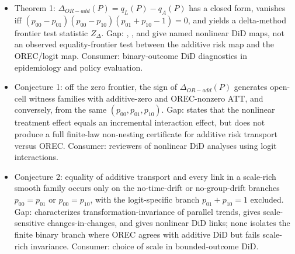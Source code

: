\documentclass[11pt]{article}
\theoremstyle{definition}
\theoremstyle{plain}
\theoremstyle{remark}
\begin{document}
\begin{itemize}[leftmargin=*]
\item Theorem 1: \(\Delta_{OR-add}(P)=q_L(P)-q_A(P)\) has a closed form, vanishes iff \((p_{00}-p_{01})(p_{00}-p_{10})(p_{01}+p_{10}-1)=0\), and yields a delta-method frontier test statistic \(Z_{\Delta}\). Gap: \citet[Abstract and Sec. 2]{ParkTchetgenTchetgen2022}, \citet[Abstract and Sec. 2]{TchetgenTchetgenParkRichardson2024}, and \citet[Sec. 2]{Wooldridge2023} give named nonlinear DiD maps, not an observed equality-frontier test between the additive risk map and the OREC/logit map. Consumer: binary-outcome DiD diagnostics in epidemiology and policy evaluation.
\item Conjecture 1: off the zero frontier, the sign of \(\Delta_{OR-add}(P)\) generates open-cell witness families with additive-zero and OREC-nonzero ATT, and conversely, from the same \((p_{00},p_{01},p_{10})\). Gap: \citet[p. 85, Abstract]{Puhani2012} states that the nonlinear treatment effect equals an incremental interaction effect, but does not produce a full finite-law non-nesting certificate for additive risk transport versus OREC. Consumer: reviewers of nonlinear DiD analyses using logit interactions.
\item Conjecture 2: equality of additive transport and every link in a scale-rich smooth family occurs only on the no-time-drift or no-group-drift branches \(p_{00}=p_{01}\) or \(p_{00}=p_{10}\), with the logit-specific branch \(p_{01}+p_{10}=1\) excluded. Gap: \citet[Theorem 1 and Sec. 3]{RothSantAnna2023} characterizes transformation-invariance of parallel trends, \citet[Sec. 3]{AtheyImbens2006} gives scale-sensitive changes-in-changes, and \citet[Sec. 2]{Wooldridge2023} gives nonlinear DiD links; none isolates the finite binary branch where OREC agrees with additive DiD but fails scale-rich invariance. Consumer: choice of scale in bounded-outcome DiD.
\end{itemize}
\end{document}
